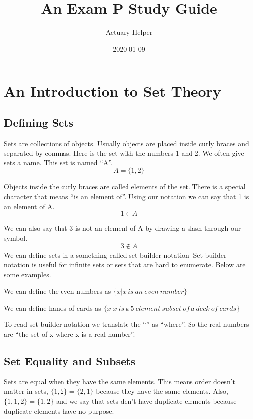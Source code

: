 \documentclass[
]{book}
\title{An Exam P Study Guide}
\author{Actuary Helper}
\date{2020-01-09}
\theoremstyle{definition}
\theoremstyle{definition}
\theoremstyle{definition}
\theoremstyle{remark}
\begin{document}
\frontmatter
\maketitle

{
\setcounter{tocdepth}{1}
\tableofcontents
}
\mainmatter
\hypertarget{an-introduction-to-set-theory}{%
\chapter{An Introduction to Set Theory}\label{an-introduction-to-set-theory}}

\hypertarget{defining-sets}{%
\section{Defining Sets}\label{defining-sets}}

Sets are collections of objects. Usually objects are placed inside curly braces and separated by commas. Here is the set with the numbers 1 and 2. We often give sets a name. This set is named ``A''. \[A=\{1,2\}\]

Objects inside the curly braces are called elements of the set. There is a special character that means ``is an element of''. Using our notation we can say that 1 is an element of A. \[1 \in A\]

We can also say that 3 is not an element of A by drawing a slash through our symbol.
\[3 \not\in A\]
We can define sets in a something called set-builder notation. Set builder notation is useful for infinite sets or sets that are hard to enumerate. Below are some examples.

We can define the even numbers as \(\{x | x \ is \  an \  even \ number\}\)

We can define hands of cards as \(\{x | x \ is \  a \ 5 \ element \ subset \ of \ a \ deck \ of \ cards\}\)

To read set builder notation we translate the ``\textbar{}'' as ``where''. So the real numbers are ``the set of x where x is a real number''.

\hypertarget{set-equality-and-subsets}{%
\section{Set Equality and Subsets}\label{set-equality-and-subsets}}

Sets are equal when they have the same elements. This means order doesn't matter in sets, \(\{1,2\} = \{2,1\}\) because they have the same elements. Also, \(\{1,1,2\} = \{1,2\}\) and we say that sets don't have duplicate elements because duplicate elements have no purpose.
\end{document}
